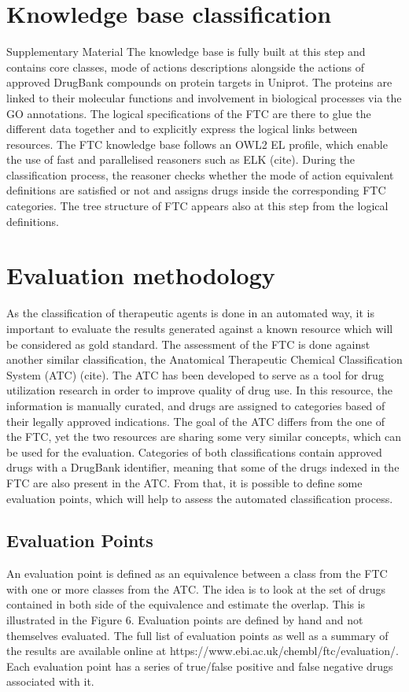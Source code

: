 \documentclass{bioinfo}
\begin{document}
\section{Knowledge base classification}Supplementary Material
The knowledge base is fully built at this step and contains core classes, mode 
of actions descriptions alongside the actions of approved DrugBank compounds on 
protein targets in Uniprot. The proteins are linked to their molecular functions and involvement in 
biological processes via the GO annotations. The logical specifications of the FTC are there to glue 
the different data together and to explicitly express the logical links between resources. The FTC 
knowledge base follows an OWL2 EL profile, which enable the use of fast and parallelised reasoners such 
as ELK (cite). During the classification process, the reasoner checks whether the mode of action equivalent 
definitions are satisfied or not and assigns drugs inside the corresponding FTC categories. The tree structure 
of FTC appears also at this step from the logical definitions.

\section{Evaluation methodology}
As the classification of therapeutic agents is done in an automated way, it 
is important to evaluate the results generated against a known resource which will be 
considered as gold standard. The assessment of the FTC is done against another similar 
classification, the Anatomical Therapeutic Chemical Classification System (ATC) (cite). 
The ATC has been developed to serve as a tool for drug utilization research in order to 
improve quality of drug use. In this resource, the information is manually curated, and drugs 
are assigned to categories based of their legally approved indications. The goal of the ATC differs 
from the one of the FTC, yet the two resources are sharing some very similar concepts, which can be 
used for the evaluation. Categories of both classifications contain approved drugs with a DrugBank 
identifier, meaning that some of the drugs indexed in the FTC are also present in the ATC. From that, 
it is possible to define some evaluation points, which will help to assess the automated classification process.

\subsection{Evaluation Points}
An evaluation point is defined as an equivalence between a class from the FTC with one or 
more classes from the ATC. The idea is to look at the set of drugs contained in both side of the 
equivalence and estimate the overlap. This is illustrated in the Figure 6. Evaluation points are defined 
by hand and not themselves evaluated. The full list of evaluation points as well as a summary of the results 
are available online at https://www.ebi.ac.uk/chembl/ftc/evaluation/. Each evaluation point has a series of 
true/false positive and false negative drugs associated with it.
 
\end{document}
